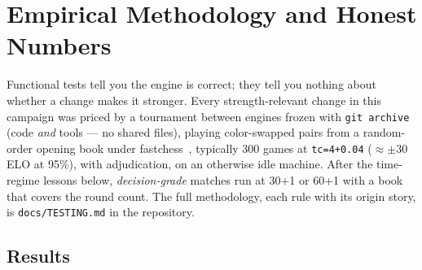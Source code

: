 \documentclass[11pt]{article}
\theoremstyle{plain}
\theoremstyle{definition}
\theoremstyle{remark}
\begin{document}
\section{Empirical Methodology and Honest Numbers}
\label{sec:empirical}

Functional tests tell you the engine is correct; they tell you nothing
about whether a change makes it stronger.  Every strength-relevant
change in this campaign was priced by a tournament between engines
frozen with \texttt{git archive} (code \emph{and} tools --- no shared
files), playing color-swapped pairs from a random-order opening book
under fastchess~\cite{fastchess}, typically 300 games at
\texttt{tc=4+0.04} ($\approx \pm 30$ ELO at 95\%), with adjudication,
on an otherwise idle machine.  After the time-regime lessons below,
\emph{decision-grade} matches run at 30+1 or 60+1 with a book that
covers the round count.  The full methodology, each rule with its
origin story, is \texttt{docs/TESTING.md} in the repository.

\subsection{Results}
\end{document}
